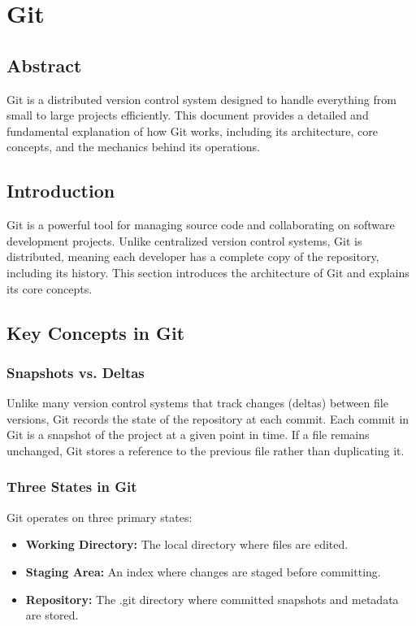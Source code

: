 \chapter{Git}

\section*{Abstract}
Git is a distributed version control system designed to handle everything from small to large projects efficiently. This document provides a detailed and fundamental explanation of how Git works, including its architecture, core concepts, and the mechanics behind its operations.

\section{Introduction}
Git is a powerful tool for managing source code and collaborating on software development projects. Unlike centralized version control systems, Git is distributed, meaning each developer has a complete copy of the repository, including its history. This section introduces the architecture of Git and explains its core concepts.

\section{Key Concepts in Git}

\subsection{Snapshots vs. Deltas}
Unlike many version control systems that track changes (deltas) between file versions, Git records the state of the repository at each commit. Each commit in Git is a snapshot of the project at a given point in time. If a file remains unchanged, Git stores a reference to the previous file rather than duplicating it.

\subsection{Three States in Git}
Git operates on three primary states:
\begin{itemize}
    \item \textbf{Working Directory:} The local directory where files are edited.
    \item \textbf{Staging Area:} An index where changes are staged before committing.
    \item \textbf{Repository:} The .git directory where committed snapshots and metadata are stored.
\end{itemize}

